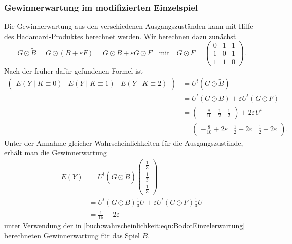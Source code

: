 \subsubsection{Gewinnerwartung im modifizierten Einzelspiel}
Die Gewinnerwartung aus den verschiedenen Ausgangszuständen kann mit Hilfe
des Hadamard-Produktes berechnet werden.
Wir berechnen dazu zunächst
\[
G\odot \tilde{B}
=
G\odot (B+\varepsilon F)
=
G\odot B + \varepsilon G\odot F
\quad\text{mit}\quad
G\odot F = \begin{pmatrix}
0&1&1\\
1&0&1\\
1&1&0
\end{pmatrix}.
\]
Nach der früher dafür gefundenen Formel ist
\begin{align*}
\begin{pmatrix}
E(Y\mid K\equiv 0)&
E(Y\mid K\equiv 1)&
E(Y\mid K\equiv 2)
\end{pmatrix}
&=
U^t (G\odot \tilde{B})
\\
&=
U^t (G\odot B)
+
\varepsilon
U^t (G\odot F)
\\
&=
\begin{pmatrix} -\frac{8}{10}&\frac12&\frac12 \end{pmatrix}
+
2\varepsilon U^t
\\
&=
\begin{pmatrix} -\frac{8}{10}+2\varepsilon&\frac12+2\varepsilon&\frac12+2\varepsilon \end{pmatrix}.
\end{align*}
Unter der Annahme gleicher Wahrscheinlichkeiten für die Ausgangszustände,
erhält man die Gewinnerwartung
\begin{align*}
E(Y)
&=
U^t(G\odot \tilde{B})
\begin{pmatrix}
\frac13\\
\frac13\\
\frac13
\end{pmatrix}
\\
&=
U^t
(G\odot B)
\frac13 U
+
\varepsilon
U^t
(G\odot F)
\frac13 U
\\
&=
\frac1{15}
+
2\varepsilon
\end{align*}
unter Verwendung der in
\eqref{buch:wahrscheinlichkeit:eqn:BodotEinzelerwartung}
berechneten Gewinnerwartung für das Spiel $B$.

